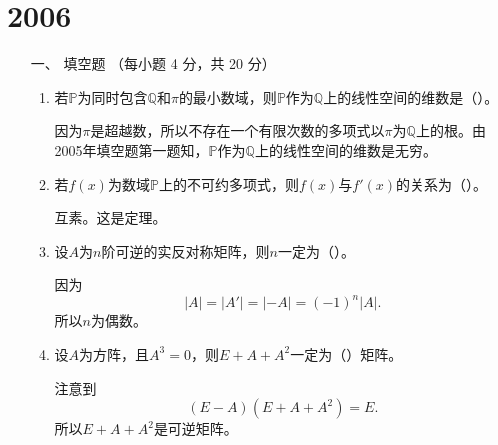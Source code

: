\section{2006}
\begin{enumerate}[1~]
\renewcommand{\labelenumi}{\textbf{\theenumi. }}
\renewcommand{\Im}{\text{Im }}
\item[一、]
填空题 （每小题 4 分，共 20 分）
\begin{enumerate}[1.~]
\item
若$\mathbb{P}$为同时包含$\mathbb{Q}$和$\pi$的最小数域，则$\mathbb{P}$作为$\mathbb{Q}$上的线性空间的维数是（\quad）。
\begin{solution}
因为$\pi$是超越数，所以不存在一个有限次数的多项式以$\pi$为$\mathbb{Q}$上的根。由2005年填空题第一题知，$\mathbb{P}$作为$\mathbb{Q}$上的线性空间的维数是无穷。
\end{solution}

\item
若$f(x)$为数域$\mathbb{P}$上的不可约多项式，则$f(x)$与$f'(x)$的关系为（\quad）。
\begin{solution}
互素。这是定理。
\end{solution}

\item
设$A$为$n$阶可逆的实反对称矩阵，则$n$一定为（\quad）。
\begin{solution}
因为\[
|A|=|A'|=|-A|=(-1)^n|A|.
\]
所以$n$为偶数。
\end{solution}

\item
设$A$为方阵，且$A^3=0$，则$E+A+A^2$一定为（\quad）矩阵。
\begin{solution}
注意到\[
(E-A)(E+A+A^2)=E.
\]
所以$E+A+A^2$是可逆矩阵。
\end{solution}


\end{enumerate}
\end{enumerate}
